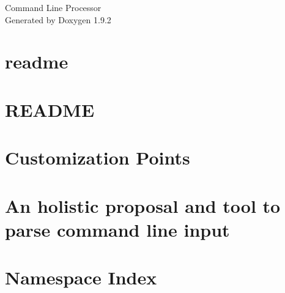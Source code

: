 \documentclass[twoside]{book}
\newcommand{\+}{\discretionary{\mbox{\scriptsize$\hookleftarrow$}}{}{}}
\newcommand{\clearemptydoublepage}{%
    \newpage{\pagestyle{empty}\cleardoublepage}%
  }
\begin{document}
  \raggedbottom
    \hypersetup{pageanchor=false,
                bookmarksnumbered=true,
                pdfencoding=unicode
               }
  \begin{titlepage}
  \vspace*{7cm}
  \begin{center}%
  {\Large Command Line Processor}\\
  \vspace*{1cm}
  {\large Generated by Doxygen 1.9.2}\\
  \end{center}
  \end{titlepage}
  \clearemptydoublepage
  \tableofcontents
  \clearemptydoublepage
  \hypersetup{pageanchor=true}
\chapter{readme}
\label{md_cmdline_readme}

\chapter{README}
\label{md_docs_user_manual__r_e_a_d_m_e}

\chapter{Customization Points}
\label{md_packages__microsoft_googletest_v140_windesktop_msvcstl_static_rt_dyn_1_8_1_4_build_native_inc70b37573e3257c1e46f815aa0c94d5f0}

\chapter{An holistic proposal and tool to parse command line input}
\label{md__r_e_a_d_m_e}

\chapter{Namespace Index}

\end{document}
